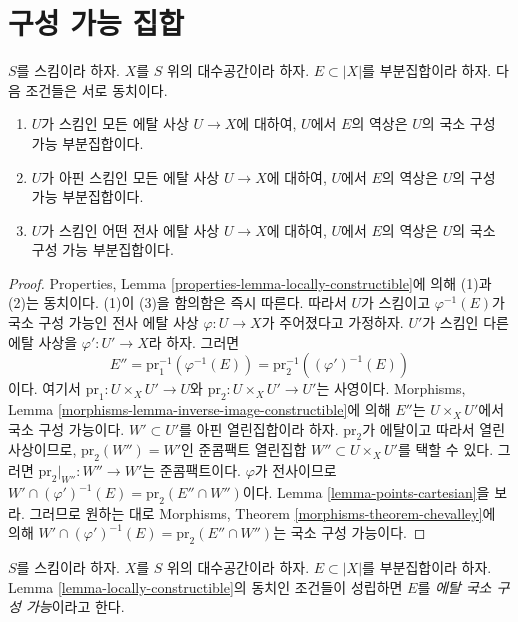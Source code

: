 \section{구성 가능 집합}
\label{section-constructible}

\begin{lemma}
\label{lemma-locally-constructible}
$S$를 스킴이라 하자. $X$를 $S$ 위의 대수공간이라 하자.
$E \subset |X|$를 부분집합이라 하자. 다음 조건들은 서로 동치이다.
\begin{enumerate}
\item $U$가 스킴인 모든 에탈 사상 $U \to X$에 대하여,
$U$에서 $E$의 역상은 $U$의 국소 구성 가능 부분집합이다.
\item $U$가 아핀 스킴인 모든 에탈 사상 $U \to X$에 대하여,
$U$에서 $E$의 역상은 $U$의 구성 가능 부분집합이다.
\item $U$가 스킴인 어떤 전사 에탈 사상 $U \to X$에 대하여,
$U$에서 $E$의 역상은 $U$의 국소 구성 가능 부분집합이다.
\end{enumerate}
\end{lemma}

\begin{proof}
Properties, Lemma \ref{properties-lemma-locally-constructible}에 의해
(1)과 (2)는 동치이다. (1)이 (3)을 함의함은 즉시 따른다.
따라서 $U$가 스킴이고 $\varphi^{-1}(E)$가 국소 구성 가능인 전사 에탈 사상
$\varphi : U \to X$가 주어졌다고 가정하자. $U'$가 스킴인 다른 에탈 사상을
$\varphi' : U' \to X$라 하자. 그러면
$$
E'' = \text{pr}_1^{-1}(\varphi^{-1}(E)) = \text{pr}_2^{-1}((\varphi')^{-1}(E))
$$
이다. 여기서 $\text{pr}_1 : U \times_X U' \to U$와
$\text{pr}_2 : U \times_X U' \to U'$는 사영이다.
Morphisms, Lemma \ref{morphisms-lemma-inverse-image-constructible}에 의해
$E''$는 $U \times_X U'$에서 국소 구성 가능이다.
$W' \subset U'$를 아핀 열린집합이라 하자. $\text{pr}_2$가 에탈이고 따라서
열린 사상이므로, $\text{pr}_2(W'') = W'$인 준콤팩트 열린집합
$W'' \subset U \times_X U'$를 택할 수 있다.
그러면 $\text{pr}_2|_{W''} : W'' \to W'$는 준콤팩트이다.
$\varphi$가 전사이므로
$W' \cap (\varphi')^{-1}(E) = \text{pr}_2(E'' \cap W'')$이다.
Lemma \ref{lemma-points-cartesian}을 보라.
그러므로 원하는 대로 Morphisms, Theorem
\ref{morphisms-theorem-chevalley}에 의해
$W' \cap (\varphi')^{-1}(E) = \text{pr}_2(E'' \cap W'')$는
국소 구성 가능이다.
\end{proof}

\begin{definition}
\label{definition-locally-constructible}
$S$를 스킴이라 하자. $X$를 $S$ 위의 대수공간이라 하자.
$E \subset |X|$를 부분집합이라 하자. Lemma
\ref{lemma-locally-constructible}의 동치인 조건들이 성립하면
$E$를 {\it 에탈 국소 구성 가능}이라고 한다.
\end{definition}

